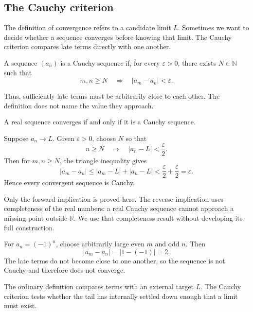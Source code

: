 \subsection{The Cauchy criterion}

The definition of convergence refers to a candidate limit $L$. Sometimes we want to decide whether a sequence converges before knowing that limit. The Cauchy criterion compares late terms directly with one another.

\begin{definitionbox}
A sequence $(a_n)$ is a Cauchy sequence if, for every $\varepsilon>0$, there exists $N\in\mathbb N$ such that
\[
m,n\ge N \quad\Longrightarrow\quad |a_m-a_n|<\varepsilon.
\]
\end{definitionbox}

Thus, sufficiently late terms must be arbitrarily close to each other. The definition does not name the value they approach.

\begin{theorembox}
A real sequence converges if and only if it is a Cauchy sequence.
\end{theorembox}

\begin{proofbox}
Suppose $a_n\to L$. Given $\varepsilon>0$, choose $N$ so that
\[
n\ge N \quad\Longrightarrow\quad |a_n-L|<\frac\varepsilon2.
\]
Then for $m,n\ge N$, the triangle inequality gives
\[
|a_m-a_n|
\le |a_m-L|+|a_n-L|
<\frac\varepsilon2+\frac\varepsilon2
=\varepsilon.
\]
Hence every convergent sequence is Cauchy.
\end{proofbox}

\begin{remarkbox}
Only the forward implication is proved here. The reverse implication uses completeness of the real numbers: a real Cauchy sequence cannot approach a missing point outside $\mathbb R$. We use that completeness result without developing its full construction.
\end{remarkbox}

\begin{examplebox}
For $a_n=(-1)^n$, choose arbitrarily large even $m$ and odd $n$. Then
\[
|a_m-a_n|=|1-(-1)|=2.
\]
The late terms do not become close to one another, so the sequence is not Cauchy and therefore does not converge.
\end{examplebox}

\begin{interpretationbox}
The ordinary definition compares terms with an external target $L$. The Cauchy criterion tests whether the tail has internally settled down enough that a limit must exist.
\end{interpretationbox}
